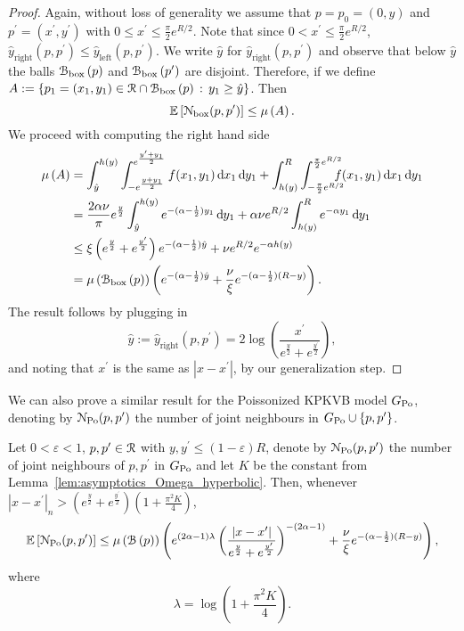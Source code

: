 \begin{proof}
Again, without loss of generality we assume that $p = p_0 = (0,y)$ and $p^\prime = (x^\prime, y^\prime)$ with $0 \le x^\prime \le \frac{\pi}{2} e^{R/2}$. Note that since $0 < x^\prime \le \frac{\pi}{2} e^{R/2}$, $ \hat{y}_{\mathrm{right}}(p,p^\prime) \le \hat{y}_{\mathrm{left}}(p,p^\prime)$. We write $\hat{y}$ for $\hat{y}_{\mathrm{right}}(p,p^\prime)$ and observe that below $\hat{y}$ the balls ${\mathcal B}_{\text{box}}\left(p\right)$ and ${\mathcal B}_{\text{box}}\left(p^\prime\right)$ are disjoint. Therefore, if we define $A := \left\{p_1 = (x_1,y_1) \in {\mathcal R} \cap {\mathcal B}_{\text{box}}\left(p\right) \, : \, y_1 \ge \hat{y} \right\}$. Then
\[
	\mathbb{E}\left[{\mathcal N}_{\text{box}}(p,p^\prime)\right] \le \mu\left(A\right).
\]
We proceed with computing the right hand side
\begin{align*}
	\Mu{A} &= \int_{\hat{y}}^{h(y)} 
		\int_{- e^{\frac{y + y_1}{2}}}^{e^{\frac{y^\prime+y_1}{2}}} 
		f(x_1,y_1) \dd x_1 \dd y_1
		+ \int_{h(y)}^{R} \int_{-\frac{\pi}{2}e^{R/2}}^{\frac{\pi}{2} e^{R/2}} 
		\hspace{-10pt}  f(x_1,y_1) \dd x_1 \dd y_1 \\
	&= \frac{2\alpha \nu}{\pi}e^{\frac{y}{2}}
		\int_{\hat{y}}^{h(y)} e^{-(\alpha - \frac{1}{2})y_1} \dd y_1 
		+ \alpha \nu e^{R/2} \int_{h(y)}^R e^{-\alpha y_1} \dd y_1\\
	&\le \xi\left(e^{\frac{y}{2}} + e^{\frac{y^\prime}{2}}\right) e^{-(\alpha-\frac{1}{2})\hat{y}}
		+ \nu e^{R/2} e^{-\alpha h(y)} \\
	&= \Mu{\BallPon{p}}\left(
		e^{-(\alpha-\frac{1}{2})\hat{y}} + \frac{\nu}{\xi} e^{-(\alpha - \frac{1}{2})(R-y)}\right).
\end{align*}
The result follows by plugging in 
\[
	\hat{y} := \hat{y}_{\text{right}}(p,p^\prime) = 2 \log\left(\frac{x^\prime}{e^{\frac{y}{2}} + e^{\frac{y^\prime}{2}}}\right),
\]
and noting that $x^\prime$ is the same as $|x - x^\prime|$, by our generalization step.

\end{proof} 

We can also prove a similar result for the Poissonized KPKVB model $G_{{\mathrm{Po}}}$, denoting by ${\mathcal N}_{{\mathrm{Po}}}(p,p^\prime)$ the number of joint neighbours in $G_{{\mathrm{Po}}} \cup \{p,p^\prime\}$.

\begin{lemma}\label{lem:common_neighbours_KPKVB}
Let $0 < \varepsilon < 1$, $p, p^\prime \in {\mathcal R}$ with $y,y^\prime \le (1-\varepsilon)R$, denote by ${\mathcal N}_{{\mathrm{Po}}}(p,p^\prime)$ the number of joint neighbours of $p, p^\prime$ in $G_{{\mathrm{Po}}}$ and let $K$ be the constant from Lemma~\ref{lem:asymptotics_Omega_hyperbolic}. Then, whenever $|x - x^\prime|_n > \left(e^{\frac{y}{2}} + e^{\frac{y^\prime}{2}}\right)\left(1 + \frac{\pi^2 K}{4}\right)$,
\[
	\mathbb{E}\left[{\mathcal N}_{{\mathrm{Po}}}(p,p^\prime)\right] \le \mu\left({\mathcal B}\left(p\right)\right)
	\left(e^{(2\alpha - 1)\lambda} \left(\frac{|x - x^\prime|}{e^{\frac{y}{2}} + e^{\frac{y^\prime}{2}}}\right)^{-(2\alpha - 1)}  
	+ \frac{\nu}{\xi} e^{-(\alpha - \frac{1}{2})(R-y)}\right),
\]
where
\[
	\lambda = \log\left(1 + \frac{\pi^2 K}{4}\right).
\]
\end{lemma}


